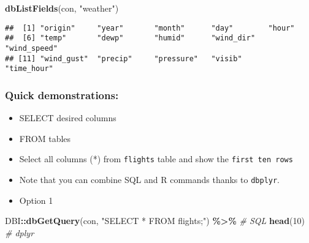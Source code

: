 \documentclass[
]{book}
\newenvironment{Shaded}{\begin{snugshade}}{\end{snugshade}}
\newcommand{\CommentTok}[1]{\textcolor[rgb]{0.56,0.35,0.01}{\textit{#1}}}
\newcommand{\DecValTok}[1]{\textcolor[rgb]{0.00,0.00,0.81}{#1}}
\newcommand{\KeywordTok}[1]{\textcolor[rgb]{0.13,0.29,0.53}{\textbf{#1}}}
\newcommand{\NormalTok}[1]{#1}
\newcommand{\OperatorTok}[1]{\textcolor[rgb]{0.81,0.36,0.00}{\textbf{#1}}}
\newcommand{\StringTok}[1]{\textcolor[rgb]{0.31,0.60,0.02}{#1}}
\begin{document}
\begin{Shaded}
\begin{Highlighting}[]
\KeywordTok{dbListFields}\NormalTok{(con, }\StringTok{"weather"}\NormalTok{)}
\end{Highlighting}
\end{Shaded}

\begin{verbatim}
##  [1] "origin"     "year"       "month"      "day"        "hour"      
##  [6] "temp"       "dewp"       "humid"      "wind_dir"   "wind_speed"
## [11] "wind_gust"  "precip"     "pressure"   "visib"      "time_hour"
\end{verbatim}

\hypertarget{quick-demonstrations}{%
\subsubsection{Quick demonstrations:}\label{quick-demonstrations}}

\begin{itemize}
\item
  SELECT desired columns
\item
  FROM tables
\item
  Select all columns (*) from \texttt{flights} table and show the \texttt{first\ ten\ rows}
\item
  Note that you can combine SQL and R commands thanks to \texttt{dbplyr}.
\item
  Option 1
\end{itemize}

\begin{Shaded}
\begin{Highlighting}[]
\NormalTok{DBI}\OperatorTok{::}\KeywordTok{dbGetQuery}\NormalTok{(con, }
                \StringTok{"SELECT * FROM flights;"}\NormalTok{) }\OperatorTok{\%\textgreater{}\%}\StringTok{ }\CommentTok{\# SQL}
\StringTok{  }\KeywordTok{head}\NormalTok{(}\DecValTok{10}\NormalTok{) }\CommentTok{\# dplyr }
\end{Highlighting}
\end{Shaded}
\end{document}
